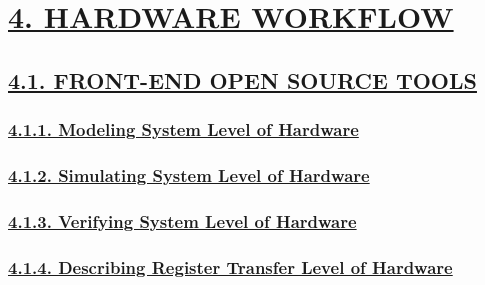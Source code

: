 \documentclass[
]{article}
\begin{document}
\hypertarget{hardware-workflow}{%
\section{\texorpdfstring{\protect\hyperlink{hardware-workflow-1}{4.
HARDWARE WORKFLOW}}{4. HARDWARE WORKFLOW}}\label{hardware-workflow}}

\hypertarget{front-end-open-source-tools}{%
\subsection{\texorpdfstring{\protect\hyperlink{front-end-open-source-tools-2}{4.1.
FRONT-END OPEN SOURCE
TOOLS}}{4.1. FRONT-END OPEN SOURCE TOOLS}}\label{front-end-open-source-tools}}

\hypertarget{modeling-system-level-of-hardware}{%
\subsubsection{\texorpdfstring{\protect\hyperlink{modeling-system-level-of-hardware-1}{4.1.1.
Modeling System Level of
Hardware}}{4.1.1. Modeling System Level of Hardware}}\label{modeling-system-level-of-hardware}}

\hypertarget{simulating-system-level-of-hardware}{%
\subsubsection{\texorpdfstring{\protect\hyperlink{simulating-system-level-of-hardware-1}{4.1.2.
Simulating System Level of
Hardware}}{4.1.2. Simulating System Level of Hardware}}\label{simulating-system-level-of-hardware}}

\hypertarget{verifying-system-level-of-hardware}{%
\subsubsection{\texorpdfstring{\protect\hyperlink{verifying-system-level-of-hardware-1}{4.1.3.
Verifying System Level of
Hardware}}{4.1.3. Verifying System Level of Hardware}}\label{verifying-system-level-of-hardware}}

\hypertarget{describing-register-transfer-level-of-hardware}{%
\subsubsection{\texorpdfstring{\protect\hyperlink{describing-register-transfer-level-of-hardware-1}{4.1.4.
Describing Register Transfer Level of
Hardware}}{4.1.4. Describing Register Transfer Level of Hardware}}\label{describing-register-transfer-level-of-hardware}}
\end{document}
